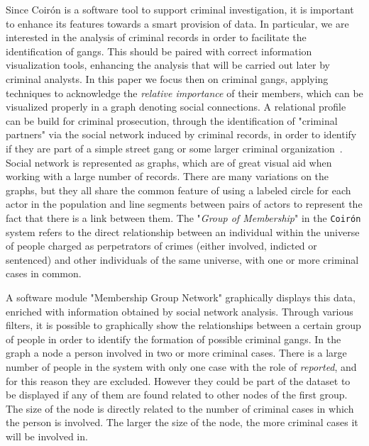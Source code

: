 Since Coirón is a software tool to support criminal investigation, it is important to enhance its features towards a smart provision of data.
In particular, we are interested in the analysis of criminal records in order to facilitate the identification of gangs. 
This should be paired with correct information visualization tools, enhancing the analysis that will be carried out later by criminal analysts.
In this paper we focus then on criminal gangs, applying techniques to acknowledge the \textit{relative importance} of their members, which can be visualized properly in a graph denoting social connections.
A relational profile can be build for criminal prosecution, through the identification of "criminal partners" via the social network induced by criminal records, in order to identify if they are part of a simple street gang or some larger criminal organization~\cite{rua2020perspectiva}. 
Social network is represented as graphs, which are of great visual aid when working with a large number of records.
There are many variations on the graphs, but they all share the common feature of using a labeled circle for each actor in the population and line segments between pairs of actors to represent the fact that there is a link between them. 
The "\textit{Group of Membership}" in the \texttt{Coirón} system refers to the direct relationship between an individual within the universe of people charged as perpetrators of crimes (either involved, indicted or sentenced) and other individuals of the same universe, with one or more criminal cases in common.

A software module "Membership Group Network" graphically displays this data, enriched with information obtained by social network analysis. 
Through various filters, it is possible to graphically show the relationships between a certain group of people in order to identify the formation of possible criminal gangs.
In the graph a node a person involved in two or more criminal cases.
There is a large number of people in the system with only one case with the role of \textit{reported}, and for this reason they are excluded. 
However they could be part of the dataset to be displayed if any of them are found related to other nodes of the first group. 
The size of the node is directly related to the number of criminal cases in which the person is involved. The larger the size of the node, the more criminal cases it will be involved in.


